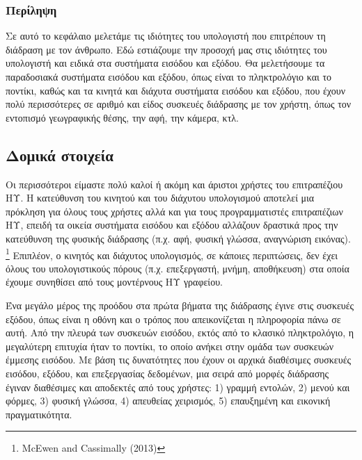 \documentclass[
]{article}
\begin{document}
\hypertarget{ux3c0ux3b5ux3c1ux3afux3bbux3b7ux3c8ux3b7}{%
\subsubsection{Περίληψη}\label{ux3c0ux3b5ux3c1ux3afux3bbux3b7ux3c8ux3b7}}

Σε αυτό το κεφάλαιο μελετάμε τις ιδιότητες του υπολογιστή που επιτρέπουν
τη διάδραση με τον άνθρωπο. Εδώ εστιάζουμε την προσοχή μας στις
ιδιότητες του υπολογιστή και ειδικά στα συστήματα εισόδου και εξόδου. Θα
μελετήσουμε τα παραδοσιακά συστήματα εισόδου και εξόδου, όπως είναι το
πληκτρολόγιο και το ποντίκι, καθώς και τα κινητά και διάχυτα συστήματα
εισόδου και εξόδου, που έχουν πολύ περισσότερες σε αριθμό και είδος
συσκευές διάδρασης με τον χρήστη, όπως τον εντοπισμό γεωγραφικής θέσης,
την αφή, την κάμερα, κτλ.

\hypertarget{ux3b4ux3bfux3bcux3b9ux3baux3ac-ux3c3ux3c4ux3bfux3b9ux3c7ux3b5ux3afux3b1}{%
\subsection{Δομικά
στοιχεία}\label{ux3b4ux3bfux3bcux3b9ux3baux3ac-ux3c3ux3c4ux3bfux3b9ux3c7ux3b5ux3afux3b1}}

Οι περισσότεροι είμαστε πολύ καλοί ή ακόμη και άριστοι χρήστες του
επιτραπέζιου ΗΥ. Η κατεύθυνση του κινητού και του διάχυτου υπολογισμού
αποτελεί μια πρόκληση για όλους τους χρήστες αλλά και για τους
προγραμματιστές επιτραπέζιων ΗΥ, επειδή τα οικεία συστήματα εισόδου και
εξόδου αλλάζουν δραστικά προς την κατεύθυνση της φυσικής διάδρασης (π.χ.
αφή, φυσική γλώσσα, αναγνώριση εικόνας). \footnote{McEwen and Cassimally
  (2013)} Επιπλέον, ο κινητός και διάχυτος υπολογισμός, σε κάποιες
περιπτώσεις, δεν έχει όλους του υπολογιστικούς πόρους (π.χ. επεξεργαστή,
μνήμη, αποθήκευση) στα οποία έχουμε συνηθίσει από τους μοντέρνους ΗΥ
γραφείου.

Ένα μεγάλο μέρος της προόδου στα πρώτα βήματα της διάδρασης έγινε στις
συσκευές εξόδου, όπως είναι η οθόνη και ο τρόπος που απεικονίζεται η
πληροφορία πάνω σε αυτή. Από την πλευρά των συσκευών εισόδου, εκτός από
το κλασικό πληκτρολόγιο, η μεγαλύτερη επιτυχία ήταν το ποντίκι, το οποίο
ανήκει στην ομάδα των συσκευών έμμεσης εισόδου. Με βάση τις δυνατότητες
που έχουν οι αρχικά διαθέσιμες συσκευές εισόδου, εξόδου, και
επεξεργασίας δεδομένων, μια σειρά από μορφές διάδρασης έγιναν διαθέσιμες
και αποδεκτές από τους χρήστες: 1) γραμμή εντολών, 2) μενού και φόρμες,
3) φυσική γλώσσα, 4) απευθείας χειρισμός, 5) επαυξημένη και εικονική
πραγματικότητα.
\end{document}
